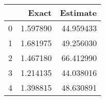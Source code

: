 \begin{tabular}{lrr}
\toprule
 & Exact & Estimate \\
\midrule
0 & 1.597890 & 44.959433 \\
1 & 1.681975 & 49.256030 \\
2 & 1.467180 & 66.412990 \\
3 & 1.214135 & 44.038016 \\
4 & 1.398815 & 48.630891 \\
\bottomrule
\end{tabular}
